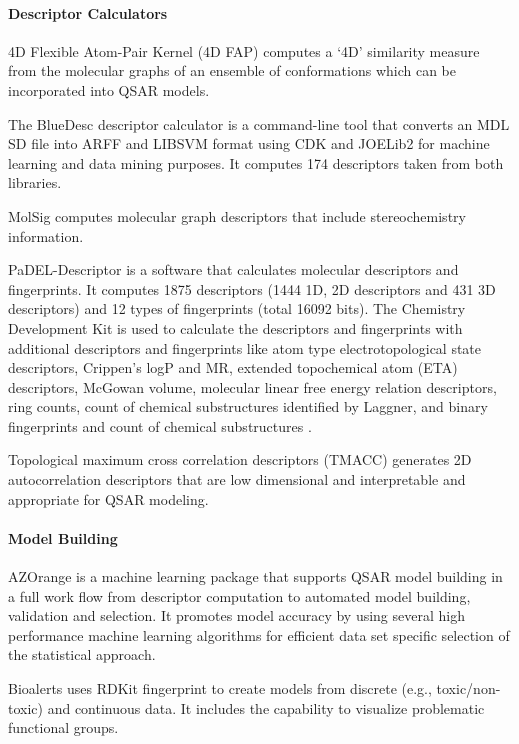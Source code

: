 \paragraph{Descriptor Calculators}
4D Flexible Atom-Pair Kernel (4D FAP) computes a `4D' similarity measure from the molecular graphs of an ensemble of conformations which can be incorporated into QSAR models.

The BlueDesc descriptor calculator is a command-line tool that converts an MDL SD file into ARFF and LIBSVM format using CDK and JOELib2 for machine learning and data mining purposes. It computes 174 descriptors taken from both libraries.

MolSig \cite{Carbonell_2013} computes molecular graph descriptors that include stereochemistry information.

PaDEL-Descriptor  \cite{Yap_2010} is a software that calculates molecular descriptors and fingerprints. It computes 1875 descriptors (1444 1D, 2D descriptors and 431 3D descriptors) and 12 types of fingerprints (total 16092 bits). The Chemistry Development Kit is used to calculate the descriptors and fingerprints with additional descriptors and fingerprints like atom type electrotopological state descriptors, Crippen's logP and MR, extended topochemical atom (ETA) descriptors, McGowan volume, molecular linear free energy relation descriptors, ring counts, count of chemical substructures identified by Laggner, and binary fingerprints and count of chemical substructures \cite{Yap_2010}.

Topological maximum cross correlation descriptors (TMACC) \cite{Melville_2007} generates 2D autocorrelation descriptors that are low dimensional and interpretable and appropriate for QSAR modeling.

\paragraph{Model Building}
AZOrange \cite{St_lring_2011} is a machine learning package that supports QSAR model building in a full work flow from descriptor computation to automated model building, validation and selection. It promotes model accuracy by using several high performance machine learning algorithms for efficient data set specific selection of the statistical approach.

Bioalerts \cite{Cortes_Ciriano_2016} uses RDKit fingerprint to create models from discrete (e.g., toxic/non-toxic) and continuous data.  It includes the capability to visualize problematic functional groups.

